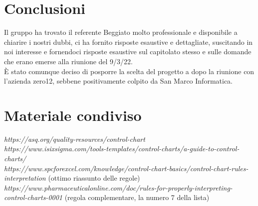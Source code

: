 \documentclass{classes/base}
\begin{document}
    \section*{Conclusioni}
    Il gruppo ha trovato il referente Beggiato molto professionale e disponibile a chiarire i nostri dubbi, ci ha fornito risposte esaustive e dettagliate, suscitando in noi interesse e fornendoci risposte esaustive sul capitolato stesso e sulle domande che erano emerse alla riunione del 9/3/22. 
    \\È stato comunque deciso di posporre la scelta del progetto a dopo la riunione con l'azienda zero12, sebbene positivamente colpito da San Marco Informatica.

    \section*{Materiale condiviso}
    \textit{https://asq.org/quality-resources/control-chart}\\
    \textit{https://www.isixsigma.com/tools-templates/control-charts/a-guide-to-control-charts/}\\
    \textit{https://www.spcforexcel.com/knowledge/control-chart-basics/control-chart-rules-interpretation} (ottimo riassunto delle regole)\\
    \textit{https://www.pharmaceuticalonline.com/doc/rules-for-properly-interpreting-control-charts-0001} (regola complementare, la numero 7 della lista)\\
\end{document}
